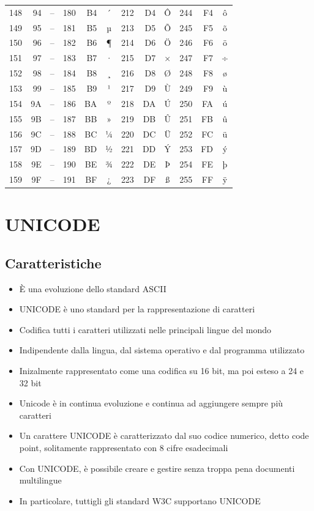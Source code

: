 \begin{table}[htbp]
\begin{tabular}{rrc|rrc|rrc|rrc}
148 & 94 & -- & 180 & B4 & ´ & 212 & D4 & Ô & 244 & F4 & ô \\
149 & 95 & -- & 181 & B5 & µ & 213 & D5 & Õ & 245 & F5 & õ \\
150 & 96 & -- & 182 & B6 & ¶ & 214 & D6 & Ö & 246 & F6 & ö \\
151 & 97 & -- & 183 & B7 & · & 215 & D7 & × & 247 & F7 & ÷ \\
152 & 98 & -- & 184 & B8 & ¸ & 216 & D8 & Ø & 248 & F8 & ø \\
153 & 99 & -- & 185 & B9 & ¹ & 217 & D9 & Ù & 249 & F9 & ù \\
154 & 9A & -- & 186 & BA & º & 218 & DA & Ú & 250 & FA & ú \\
155 & 9B & -- & 187 & BB & » & 219 & DB & Û & 251 & FB & û \\
156 & 9C & -- & 188 & BC & ¼ & 220 & DC & Ü & 252 & FC & ü \\
157 & 9D & -- & 189 & BD & ½ & 221 & DD & Ý & 253 & FD & ý \\
158 & 9E & -- & 190 & BE & ¾ & 222 & DE & Þ & 254 & FE & þ \\
159 & 9F & -- & 191 & BF & ¿ & 223 & DF & ß & 255 & FF & ÿ \\
\bottomrule
\end{tabular}
\end{table}

\newpage
\section{UNICODE}
\subsection{Caratteristiche}
\begin{itemize}
    \item È una evoluzione dello standard ASCII
    \item UNICODE è uno standard per la rappresentazione di caratteri
    \item Codifica tutti i caratteri utilizzati nelle principali lingue del mondo
    \item Indipendente dalla lingua, dal sistema operativo e dal programma utilizzato
    \item Inizalmente rappresentato come una codifica su 16 bit, ma poi esteso a 24 e 32 bit
    \item Unicode è in continua evoluzione e continua ad aggiungere sempre più caratteri
    \item Un carattere UNICODE è caratterizzato dal suo codice numerico, detto code point, solitamente rappresentato con 8 cifre esadecimali
    \item Con UNICODE, è possibile creare e gestire senza troppa pena documenti multilingue
    \item In particolare, tuttigli gli standard W3C supportano UNICODE
\end{itemize}
